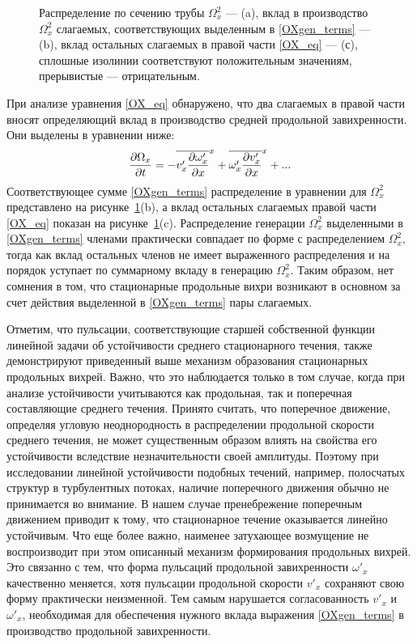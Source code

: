 \begin{figure}
\caption{Распределение по сечению трубы $\Omega_x^2$ --- (a), вклад в производство $\Omega_x^2$ слагаемых, соответствующих выделенным в \eqref{OXgen_terms} --- (b), вклад остальных слагаемых в правой части \eqref{OX_eq} --- (с), сплошные изолинии соответствуют положительным значениям, прерывистые --- отрицательным.}
\label{OXgen_pic}
\end{figure}

При анализе уравнения \eqref{OX_eq} обнаружено, что два слагаемых в правой части вносят определяющий вклад в производство средней продольной завихренности. Они выделены в уравнении ниже:
\begin{equation}\label{OXgen_terms}
\frac{\partial \Omega_x}{\partial t} = - \overline{v'_x \frac{\partial \omega'_x}{\partial x}}^x + \overline{ \omega'_x \frac{\partial v'_x}{\partial x} }^x + ... 
\end{equation}
Соответствующее сумме \eqref{OXgen_terms}  распределение в уравнении для $\Omega_x^2$ представлено на рисунке~\ref{OXgen_pic}(b), а вклад остальных слагаемых правой части \eqref{OX_eq} показан на рисунке~\ref{OXgen_pic}(c). Распределение генерации $\Omega_x^2$ выделенными в \eqref{OXgen_terms} членами практически совпадает по форме с распределением $\Omega_x^2$, тогда как вклад остальных членов не имеет выраженного распределения и на порядок уступает по суммарному вкладу в генерацию $\Omega_x^2$. Таким образом, нет сомнения в том, что стационарные продольные вихри возникают в основном за счет действия выделенной в \eqref{OXgen_terms} пары слагаемых.

Отметим, что пульсации, соответствующие старшей собственной функции линейной задачи об устойчивости среднего стационарного течения, также демонстрируют приведенный выше механизм образования стационарных продольных вихрей. Важно, что это наблюдается только в том случае, когда при анализе устойчивости учитываются как продольная, так и поперечная составляющие среднего течения. Принято считать, что поперечное движение, определяя угловую неоднородность в распределении продольной скорости среднего течения, не может существенным образом влиять на свойства его устойчивости вследствие незначительности своей амплитуды. Поэтому при исследовании линейной устойчивости подобных течений, например, полосчатых структур в турбулентных потоках, наличие поперечного движения обычно не принимается во внимание. В нашем случае пренебрежение поперечным движением приводит к тому, что стационарное течение оказывается линейно устойчивым. Что еще более важно, наименее затухающее возмущение не воспроизводит при этом описанный механизм формирования продольных вихрей. Это связанно с тем, что форма пульсаций продольной завихренности $\omega'_x$ качественно меняется, хотя пульсации продольной скорости $v'_x$ сохраняют свою форму практически неизменной. Тем самым нарушается согласованность  $v'_x$ и $\omega'_x$, необходимая для обеспечения нужного вклада выражения \eqref{OXgen_terms} в производство продольной завихренности.


